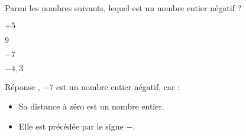 \begin{exercice}
    Parmi les nombres suivants, lequel est un nombre entier négatif ?    
    \begin{ChoixQCM}{4}
        \item $+5$
        \item $9$
        \item $-7$
        \item $-4,3$
    \end{ChoixQCM}
\end{exercice}
\begin{corrige}
    Réponse , $-7$ est un nombre entier négatif, car :
    \begin{itemize}
        \item Sa distance à zéro est un nombre entier.
        \item Elle est précédée par le signe $-$.
    \end{itemize}
\end{corrige}